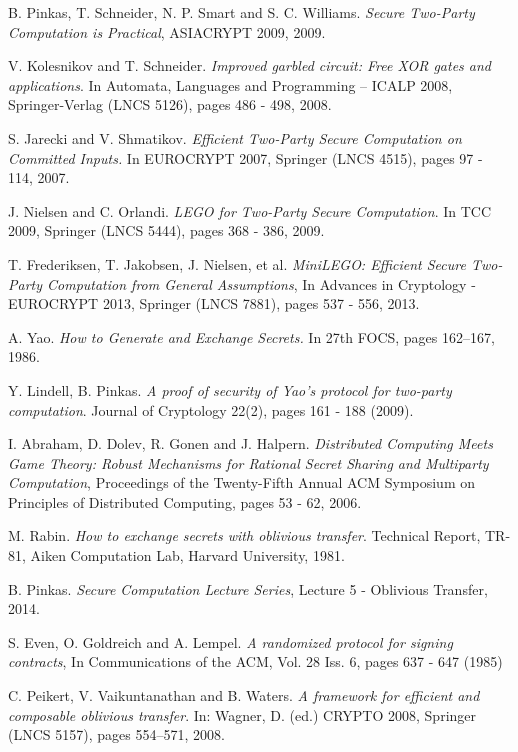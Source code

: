\documentclass[ %
                    author={Nicholas Tutte},
                supervisor={Prof. Nigel Smart},
                    degree={MEng},
                     title={Secure Two Party Computation},
                  subtitle={A practical comparison of recent protocols},
                      type={Research - GG1K},
                      year={2015} ]{dissertation}
\begin{document}
\begin{thebibliography}{99}
			B. Pinkas, T. Schneider, N. P. Smart and S. C. Williams.
			\emph{Secure Two-Party Computation is Practical},
			ASIACRYPT 2009, 2009.

			V. Kolesnikov and T. Schneider.
			\emph{Improved garbled circuit: Free XOR gates and applications}.
			In Automata, Languages and Programming – ICALP 2008, Springer-Verlag (LNCS 5126),
			pages 486 - 498,
			2008.

			S. Jarecki and V. Shmatikov.
			\emph{Efficient Two-Party Secure Computation on Committed Inputs.}
			In EUROCRYPT 2007, Springer (LNCS 4515),
			pages 97 - 114,
			2007.

			J. Nielsen and C. Orlandi. \emph{LEGO for Two-Party Secure Computation}. In TCC 2009, Springer (LNCS 5444), pages 368 - 386, 2009.

			T. Frederiksen, T. Jakobsen, J. Nielsen, et al. \emph{MiniLEGO: Efficient Secure Two-Party Computation from General Assumptions}, In Advances in Cryptology - EUROCRYPT 2013, Springer (LNCS 7881), pages 537 - 556, 2013.

			A. Yao. \emph{How to Generate and Exchange Secrets.} In 27th FOCS, pages 162–167, 1986.

			Y. Lindell, B. Pinkas. \emph{A proof of security of Yao’s protocol for two-party computation}. Journal of Cryptology 22(2), pages 161 - 188 (2009).

			I. Abraham, D. Dolev, R. Gonen and J. Halpern. \emph{Distributed Computing Meets Game Theory: Robust Mechanisms for Rational Secret Sharing and Multiparty Computation}, Proceedings of the Twenty-Fifth Annual ACM Symposium on Principles of Distributed Computing,  pages 53 - 62, 2006.

			M. Rabin. \emph{How to exchange secrets with oblivious transfer}. Technical Report, TR-81, Aiken Computation Lab, Harvard University, 1981.

			B. Pinkas. \emph{Secure Computation Lecture Series}, Lecture 5 - Oblivious Transfer, 2014.

			S. Even, O. Goldreich and A. Lempel. \emph{A randomized protocol for signing contracts}, In Communications of the ACM, Vol. 28 Iss. 6, pages 637 - 647 (1985)

			C. Peikert, V. Vaikuntanathan and B. Waters. \emph{A framework for efficient and composable oblivious transfer}. In: Wagner, D. (ed.) CRYPTO 2008, Springer (LNCS 5157), pages 554–571, 2008.


\end{thebibliography}
\end{document}
